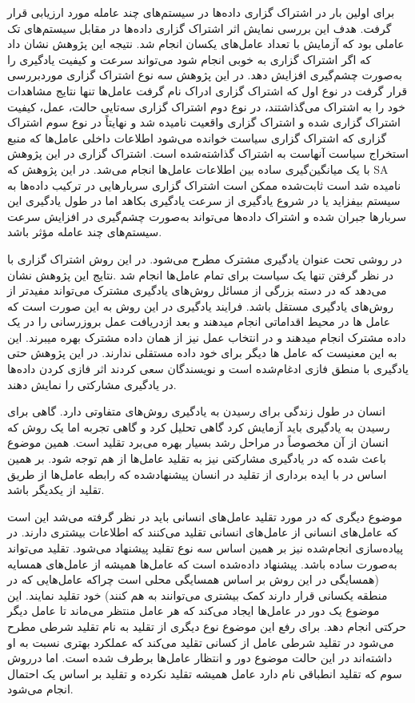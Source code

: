 برای اولین بار در اشتراک گزاری داده‌ها در سیستم‌های چند عامله مورد ارزیابی قرار گرفت. هدف این بررسی نمایش اثر اشتراک گزاری داده‌ها در مقابل سیستم‌های تک عاملی بود که آزمایش با تعداد عامل‌های یکسان انجام شد. نتیجه این پژوهش نشان داد که اگر اشتراک گزاری به خوبی انجام شود می‌تواند سرعت و کیفیت یادگیری را به‌صورت چشم‌گیری افزایش دهد. در این پژوهش سه نوع اشتراک گزاری موردبررسی قرار گرفت در نوع اول که اشتراک گزاری ادراک نام گرفت عامل‌ها تنها نتایج مشاهدات خود را به اشتراک می‌گذاشتند، در نوع دوم اشتراک گزاری سه‌تایی حالت، عمل، کیفیت اشتراک گزاری شده و اشتراک گزاری واقعیت نامیده شد و نهایتاً در نوع سوم اشتراک گزاری که اشتراک گزاری سیاست خوانده می‌شود اطلاعات داخلی عامل‌ها که منبع استخراج سیاست آنهاست به اشتراک گذاشته‌شده است. اشتراک گزاری در این پژوهش با یک میانگین‌گیری ساده بین اطلاعات عامل‌ها انجام می‌شد. در این پژوهش که SA نامیده شد است ثابت‌شده ممکن است اشتراک گزاری سربارهایی در ترکیب داده‌ها به سیستم بیفزاید یا در شروع یادگیری از سرعت یادگیری بکاهد اما در طول یادگیری این سربارها جبران شده و اشتراک داده‌ها می‌تواند به‌صورت چشم‌گیری در افزایش سرعت سیستم‌های چند عامله مؤثر باشد.


در روشی تحت عنوان یادگیری مشترک مطرح می‌شود. در این روش اشتراک گزاری با در نظر گرفتن تنها یک سیاست برای تمام عامل‌ها انجام شد .نتایج این پژوهش نشان می‌دهد که در دسته بزرگی از مسائل روش‌های یادگیری مشترک می‌تواند مفیدتر از روش‌های یادگیری مستقل باشد. فرایند یادگیری در این روش به این صورت است که عامل ها در محیط اقداماتی انجام میدهند و بعد ازدریافت عمل بروزرسانی را در یک داده مشترک انجام میدهند و در انتخاب عمل نیز از همان داده مشترک بهره میبرند. این به این معنیست که عامل ها دیگر برای خود داده مستقلی ندارند. در این پژوهش حتی یادگیری با منطق فازی ادغام‌شده است و نویسندگان سعی کردند اثر فازی کردن داده‌ها در یادگیری مشارکتی را نمایش دهند.

انسان در طول زندگی برای رسیدن به یادگیری روش‌های متفاوتی دارد. گاهی برای رسیدن به یادگیری باید آزمایش کرد گاهی تحلیل کرد و گاهی تجربه اما یک روش که انسان از آن مخصوصاً در مراحل رشد بسیار بهره می‌برد تقلید است. همین موضوع باعث شده که در یادگیری مشارکتی نیز به تقلید عامل‌ها از هم توجه شود. بر همین اساس در با ایده برداری از تقلید در انسان پیشنهادشده که رابطه عامل‌ها از طریق تقلید از یکدیگر باشد.

موضوع دیگری که در مورد تقلید عامل‌های انسانی باید در نظر گرفته می‌شد این است که عامل‌های انسانی از عامل‌های انسانی تقلید می‌کنند که اطلاعات بیشتری دارند. در پیاده‌سازی انجام‌شده نیز بر همین اساس سه نوع تقلید پیشنهاد می‌شود. تقلید می‌تواند به‌صورت ساده باشد. پیشنهاد داده‌شده است که عامل‌ها همیشه از عامل‌های همسایه (همسایگی در این روش بر اساس همسایگی محلی است چراکه عامل‌هایی که در منطقه یکسانی قرار دارند کمک بیشتری می‌توانند به هم کنند) خود تقلید نمایند. این موضوع یک دور در عامل‌ها ایجاد می‌کند که هر عامل منتظر می‌ماند تا عامل دیگر حرکتی انجام دهد. برای رفع این موضوع نوع دیگری از تقلید به نام تقلید شرطی مطرح می‌شود در تقلید شرطی عامل از کسانی تقلید می‌کند که عملکرد بهتری نسبت به او داشته‌اند در این حالت موضوع دور و انتظار عامل‌ها برطرف شده است. اما درروش سوم که تقلید انطباقی نام دارد عامل همیشه تقلید نکرده و تقلید بر اساس یک احتمال انجام می‌شود.

